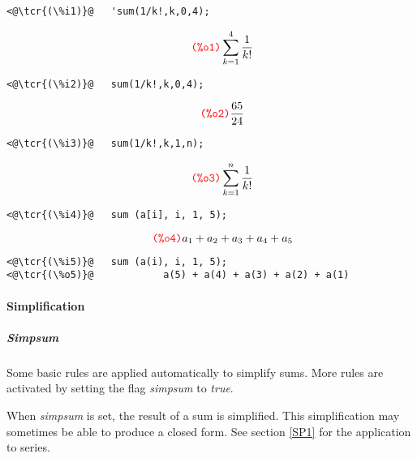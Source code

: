 \documentclass[../Maxima_Workbook.tex]{subfiles}
\begin{document}
\lz \begin{small}
\color{blue} \leqn
\begin{lstlisting}
<@\tcr{(\%i1)}@   'sum(1/k!,k,0,4);
\end{lstlisting}
\vspace{-5mm} \[\tag*{\tcr{\ttfamily (\%o1)}} \sum_{k=1}^{4} \frac{1}{k!} \]
\vspace{-6mm} \begin{lstlisting}
<@\tcr{(\%i2)}@   sum(1/k!,k,0,4);
\end{lstlisting}
\vspace{-5mm} \[\tag*{\tcr{\ttfamily (\%o2)}} \frac{65}{24} \]
\vspace{-7mm} \begin{lstlisting}
<@\tcr{(\%i3)}@   sum(1/k!,k,1,n);
\end{lstlisting}
\vspace{-4mm} \[\tag*{\tcr{\ttfamily (\%o3)}} \sum_{k=1}^{n} \frac{1}{k!} \]

\begin{lstlisting}
<@\tcr{(\%i4)}@   sum (a[i], i, 1, 5);
\end{lstlisting}
\vspace{-6mm} \[\tag*{\tcr{\ttfamily (\%o4)}} a_1+a_2+a_3+a_4+a_5 \]
\vspace{-10mm} \begin{lstlisting}
<@\tcr{(\%i5)}@   sum (a(i), i, 1, 5);
<@\tcr{(\%o5)}@ 		   a(5) + a(4) + a(3) + a(2) + a(1)
\end{lstlisting}
\color{black} \reqn
\end{small}


\paragraph{Simplification}

\subparagraph{Simpsum} \mbox{}

\lz Some basic rules are applied automatically to simplify sums. More rules are activated by setting the flag \emph{simpsum} to \emph{true}.

\lzz {} \qquad {} \hfill {}

\lz When \emph{simpsum} is set, the result of a sum is simplified. This simplification may sometimes be able to produce a closed form. See section \ref{SP1} for the application to series.
\end{document}
